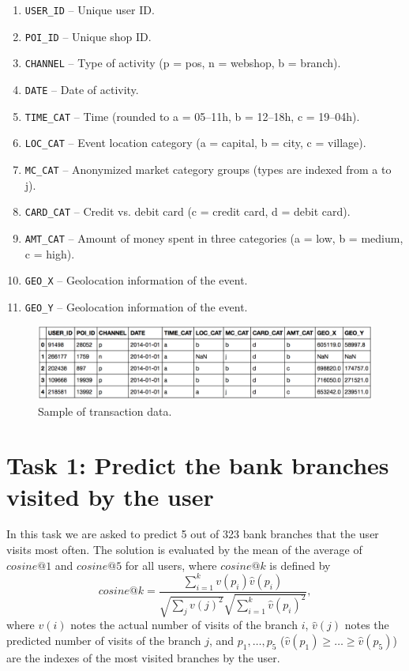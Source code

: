\documentclass{llncs}
\begin{document}
	\begin{enumerate}
		\item \verb|USER_ID| -- Unique user ID.
		\item \verb|POI_ID| -- Unique shop ID.
		\item \verb|CHANNEL| -- Type of activity (p = pos, n = webshop, b = branch).
		\item \verb|DATE| -- Date of activity.
		\item \verb|TIME_CAT| -- Time (rounded to a = 05--11h, b = 12--18h, c = 19--04h).
		\item \verb|LOC_CAT| -- Event location category (a = capital, b = city, c = village).
		\item \verb|MC_CAT| -- Anonymized market category groups (types are indexed from a to j).
		\item \verb|CARD_CAT| -- Credit vs. debit card (c = credit card, d = debit card).
		\item \verb|AMT_CAT| -- Amount of money spent in three categories (a = low, b = medium, c = high).
		\item \verb|GEO_X| -- Geolocation information of the event.
		\item \verb|GEO_Y| -- Geolocation information of the event.
	\end{enumerate}
	
	\begin{figure}[h]
		\centering
		\includegraphics[width=\textwidth]{transaction_data}
		\caption{Sample of transaction data.}
		\label{transaction_data}
	\end{figure}
	
	\section{Task 1: Predict the bank branches visited by the user}
	
	In this task we are asked to predict 5 out of 323 bank branches that the user visits most often. The solution is evaluated by the mean of the average of $cosine@1$ and $cosine@5$ for all users, where $cosine@k$ is defined by
	$$
	cosine@k = \frac{\sum_{i=1}^{k}v(p_i)\hat{v}(p_i)}{\sqrt{\sum_{j} v(j)^2} \sqrt{\sum_{i=1}^{k} \hat{v}(p_i)^2}},
	$$
	where $v(i)$ notes the actual number of visits of the branch $i$, $\hat{v}(j)$ notes the predicted number of visits of the branch $j$, and $p_1, \dots, p_5$ ($\hat{v}(p_1) \ge \ldots \ge \hat{v}(p_5)$) are the indexes of the most visited branches by the user.
	
\end{document}
